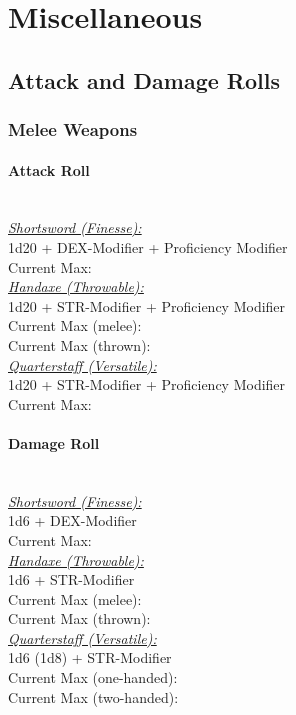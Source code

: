 \documentclass[letterpaper,openany,oneside,twocolumn]{book}
\begin{document}
\vfill\eject
\section*{Miscellaneous}
\subsection*{Attack and Damage Rolls}
\subsubsection*{Melee Weapons}
\paragraph*{Attack Roll}\hfill\\
\underline{\textit{Shortsword (Finesse):}}\\
1d20 + DEX-Modifier + Proficiency Modifier\\
\indent Current Max: 
\\
\underline{\textit{Handaxe (Throwable):}}\\
1d20 + STR-Modifier + Proficiency Modifier\\
\indent Current Max (melee): \\
\indent Current Max (thrown): 
\\
\underline{\textit{Quarterstaff (Versatile):}}\\
1d20 + STR-Modifier + Proficiency Modifier\\
\indent Current Max: 
\paragraph*{Damage Roll}\hfill\\
\underline{\textit{Shortsword (Finesse):}}\\
1d6 + DEX-Modifier\\
\indent Current Max: 
\\
\underline{\textit{Handaxe (Throwable):}}\\
1d6 + STR-Modifier\\
\indent Current Max (melee): \\
\indent Current Max (thrown): 
\\
\underline{\textit{Quarterstaff (Versatile):}}\\
1d6 (1d8) + STR-Modifier\\
\indent Current Max (one-handed): \\
\indent Current Max (two-handed): 
\end{document}
